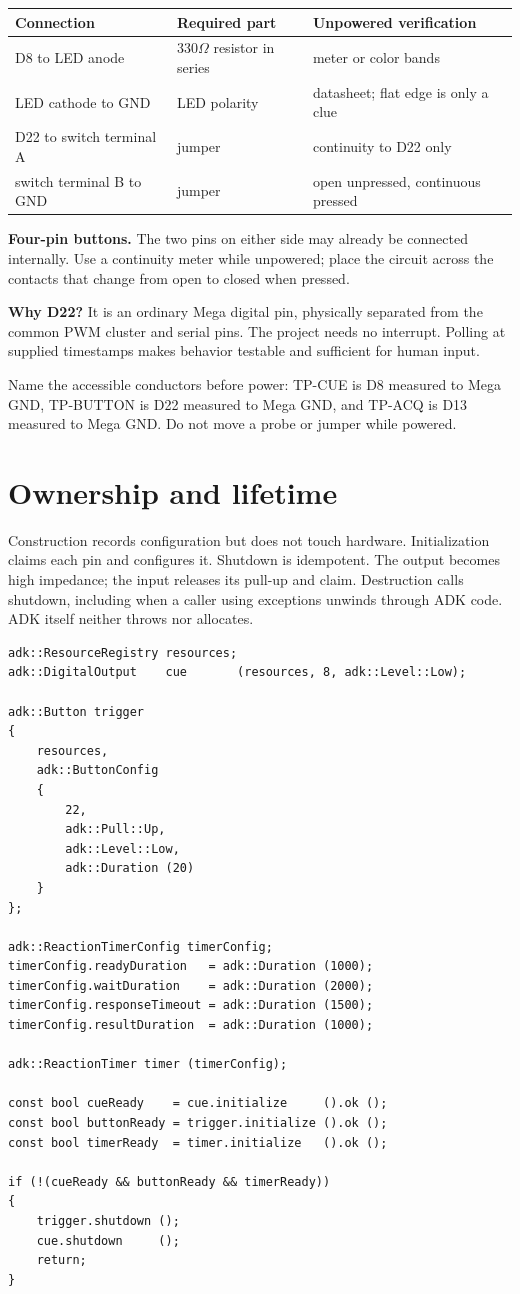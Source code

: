 \documentclass[11pt]{article}
\begin{document}
\begin{tabularx}{\linewidth}{@{}l l X@{}}
\toprule
Connection & Required part & Unpowered verification\\
\midrule
D8 to LED anode & 330\(\Omega\) resistor in series & meter or color bands\\
LED cathode to GND & LED polarity & datasheet; flat edge is only a clue\\
D22 to switch terminal A & jumper & continuity to D22 only\\
switch terminal B to GND & jumper & open unpressed, continuous pressed\\
\bottomrule
\end{tabularx}

\textbf{Four-pin buttons.} The two pins on either side may already be connected
internally. Use a continuity meter while unpowered; place the circuit across
the contacts that change from open to closed when pressed.

\textbf{Why D22?} It is an ordinary Mega digital pin, physically separated from
the common PWM cluster and serial pins. The project needs no interrupt. Polling
at supplied timestamps makes behavior testable and sufficient for human input.

Name the accessible conductors before power: TP-CUE is D8 measured to Mega GND,
TP-BUTTON is D22 measured to Mega GND, and TP-ACQ is D13 measured to Mega GND.
Do not move a probe or jumper while powered.

\section{Ownership and lifetime}

Construction records configuration but does not touch hardware. Initialization
claims each pin and configures it. Shutdown is idempotent. The output becomes
high impedance; the input releases its pull-up and claim. Destruction calls
shutdown, including when a caller using exceptions unwinds through ADK code.
ADK itself neither throws nor allocates.

\begin{lstlisting}[style=adkcpp]
adk::ResourceRegistry resources;
adk::DigitalOutput    cue       (resources, 8, adk::Level::Low);

adk::Button trigger
{
    resources,
    adk::ButtonConfig
    {
        22,
        adk::Pull::Up,
        adk::Level::Low,
        adk::Duration (20)
    }
};

adk::ReactionTimerConfig timerConfig;
timerConfig.readyDuration   = adk::Duration (1000);
timerConfig.waitDuration    = adk::Duration (2000);
timerConfig.responseTimeout = adk::Duration (1500);
timerConfig.resultDuration  = adk::Duration (1000);

adk::ReactionTimer timer (timerConfig);

const bool cueReady    = cue.initialize     ().ok ();
const bool buttonReady = trigger.initialize ().ok ();
const bool timerReady  = timer.initialize   ().ok ();

if (!(cueReady && buttonReady && timerReady))
{
    trigger.shutdown ();
    cue.shutdown     ();
    return;
}
\end{lstlisting}
\end{document}

